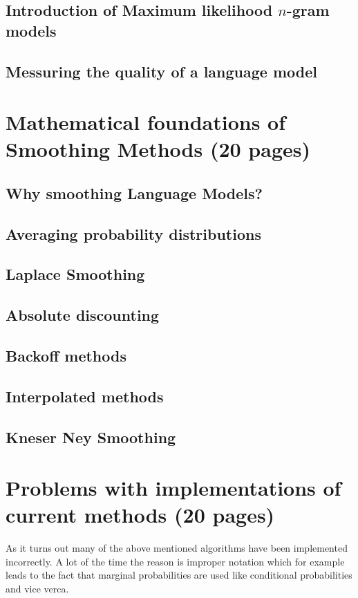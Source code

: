 \documentclass[•]{book}
\begin{document}
\section{Introduction of Maximum likelihood $n$-gram models}
\section{Messuring the quality of a language model}

\chapter{Mathematical foundations of Smoothing Methods (20 pages)}
\section{Why smoothing Language Models?}
\section{Averaging probability distributions}
\section{Laplace Smoothing}
\section{Absolute discounting}
\section{Backoff methods}
\section{Interpolated methods}
\section{Kneser Ney Smoothing}

\chapter{Problems with implementations of current methods (20 pages)}
As it turns out many of the above mentioned algorithms have been implemented incorrectly. 
A lot of the time the reason is improper notation which for example leads to the fact that marginal probabilities are used like conditional probabilities and vice verca. 
\end{document}

